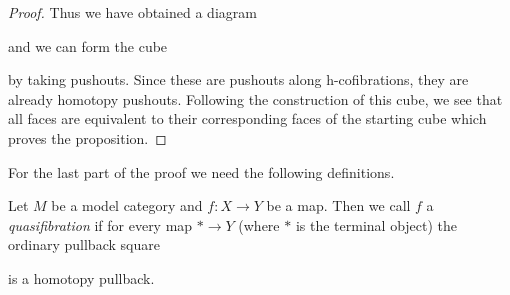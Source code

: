 \begin{prop}
\begin{proof}
        Thus we have obtained a diagram
        \begin{center}
        \end{center}
        and we can form the cube 
        \begin{center}
        \end{center}
        by taking pushouts.
        Since these are pushouts along h-cofibrations, they are already homotopy pushouts. 
        Following the construction of this cube, we see that all faces are equivalent to their corresponding faces of the starting cube which proves the proposition.
    \end{proof}
\end{prop}
For the last part of the proof we need the following definitions.
\begin{definition}[Quasifibration]
    Let $M$ be a model category and $f\colon X\to Y$ be a map.
    Then we call $f$ a \emph{quasifibration} if for every map $*\to Y$ (where $*$ is the terminal object) the ordinary pullback square
    \begin{center}
    \end{center}
    is a homotopy pullback.
\end{definition}
